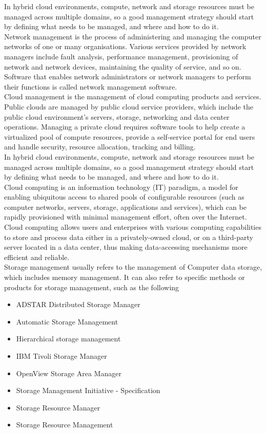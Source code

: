 \documentclass[a4paper,12pt]{report}
\begin{document}
In hybrid cloud environments, compute, network and storage resources must be managed across multiple domains, so a good management strategy should start by defining what needs to be managed, and where and how to do it.\\

Network management is the process of administering and managing the computer networks of one or many organisations. Various services provided by network managers include fault analysis, performance management, provisioning of network and network devices, maintaining the quality of service, and so on. Software that enables network administrators or network managers to perform their functions is called network management software.\\

Cloud management is the management of cloud computing products and services. Public clouds are managed by public cloud service providers, which include the public cloud environment’s servers, storage, networking and data center operations. Managing a private cloud requires software tools to help create a virtualized pool of compute resources, provide a self-service portal for end users and handle security, resource allocation, tracking and billing.\\

In hybrid cloud environments, compute, network and storage resources must be managed across multiple domains, so a good management strategy should start by defining what needs to be managed, and where and how to do it.\\

Cloud computing is an information technology (IT) paradigm, a model for enabling ubiquitous access to shared pools of configurable resources (such as computer networks, servers, storage, applications and services), which can be rapidly provisioned with minimal management effort, often over the Internet. Cloud computing allows users and enterprises with various computing capabilities to store and process data either in a privately-owned cloud, or on a third-party server located in a data center, thus making data-accessing mechanisms more efficient and reliable.\\

Storage management usually refers to the management of Computer data storage, which includes memory management. It can also refer to specific methods or products for storage management, such as the following
\begin{itemize}
	\item ADSTAR Distributed Storage Manager
	\item Automatic Storage Management
	\item Hierarchical storage management
	\item IBM Tivoli Storage Manager
	\item OpenView Storage Area Manager
	\item Storage Management Initiative - Specification
	\item Storage Resource Manager
	\item Storage Resource Management
\end{itemize}
\end{document}
